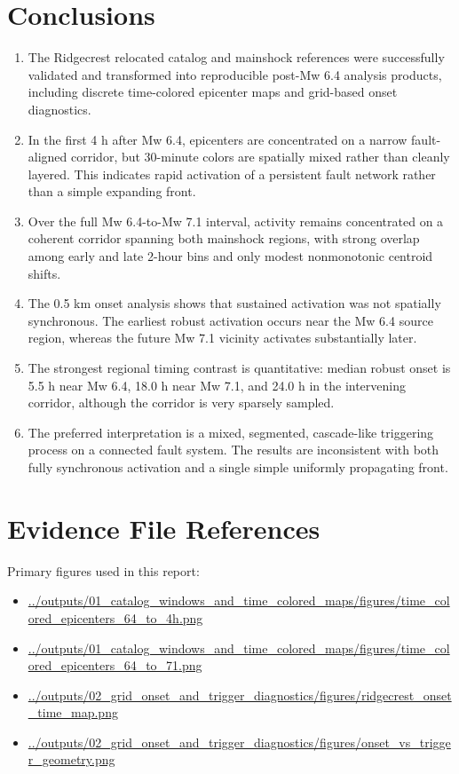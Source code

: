 \documentclass[11pt]{article}
\begin{document}
\section{Conclusions}
\begin{enumerate}[leftmargin=1.5em]
    \item The Ridgecrest relocated catalog and mainshock references were successfully validated and transformed into reproducible post-Mw 6.4 analysis products, including discrete time-colored epicenter maps and grid-based onset diagnostics.

    \item In the first 4 h after Mw 6.4, epicenters are concentrated on a narrow fault-aligned corridor, but 30-minute colors are spatially mixed rather than cleanly layered. This indicates rapid activation of a persistent fault network rather than a simple expanding front.

    \item Over the full Mw 6.4-to-Mw 7.1 interval, activity remains concentrated on a coherent corridor spanning both mainshock regions, with strong overlap among early and late 2-hour bins and only modest nonmonotonic centroid shifts.

    \item The 0.5 km onset analysis shows that sustained activation was not spatially synchronous. The earliest robust activation occurs near the Mw 6.4 source region, whereas the future Mw 7.1 vicinity activates substantially later.

    \item The strongest regional timing contrast is quantitative: median robust onset is 5.5 h near Mw 6.4, 18.0 h near Mw 7.1, and 24.0 h in the intervening corridor, although the corridor is very sparsely sampled.

    \item The preferred interpretation is a mixed, segmented, cascade-like triggering process on a connected fault system. The results are inconsistent with both fully synchronous activation and a single simple uniformly propagating front.
\end{enumerate}

\section*{Evidence File References}
Primary figures used in this report:
\begin{itemize}[leftmargin=1.5em]
    \item \url{../outputs/01_catalog_windows_and_time_colored_maps/figures/time_colored_epicenters_64_to_4h.png}
    \item \url{../outputs/01_catalog_windows_and_time_colored_maps/figures/time_colored_epicenters_64_to_71.png}
    \item \url{../outputs/02_grid_onset_and_trigger_diagnostics/figures/ridgecrest_onset_time_map.png}
    \item \url{../outputs/02_grid_onset_and_trigger_diagnostics/figures/onset_vs_trigger_geometry.png}
\end{itemize}
\end{document}
